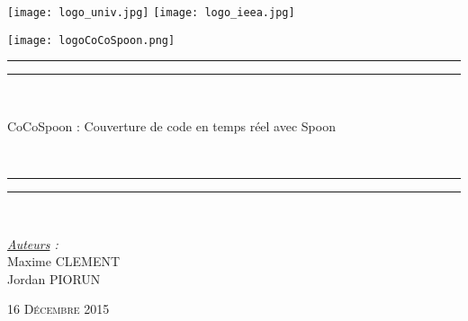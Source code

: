 \thispagestyle{cover}

\texttt{[image: logo\_univ.jpg]}
 \hfill \texttt{[image: logo\_ieea.jpg]} \\

\vspace*{15mm}

\begin{center}

	\vspace*{15mm}

	\texttt{[image: logoCoCoSpoon.png]}

	\rule[0.5ex]{\linewidth}{2pt}\vspace*{-\baselineskip}\vspace*{3.2pt}


	\rule[0.5ex]{\linewidth}{1pt}\\[\baselineskip]

		\begin{Huge}CoCoSpoon : Couverture de code en temps réel avec Spoon \end{Huge}\\[4mm]

	\rule[0.5ex]{\linewidth}{1pt}\vspace*{-\baselineskip}\vspace{3.2pt}
	\rule[0.5ex]{\linewidth}{2pt}\\

	\vspace*{20mm}

	{\LARGE \textit{\underline{Auteurs} :}}\\
	\vspace*{3mm}
	{\LARGE Maxime CLEMENT}\\
	\vspace*{3mm}
	{\LARGE Jordan PIORUN}\\
	
	\vspace*{20mm}
	
	{\LARGE\textsc{16 Décembre 2015}}
\end{center}